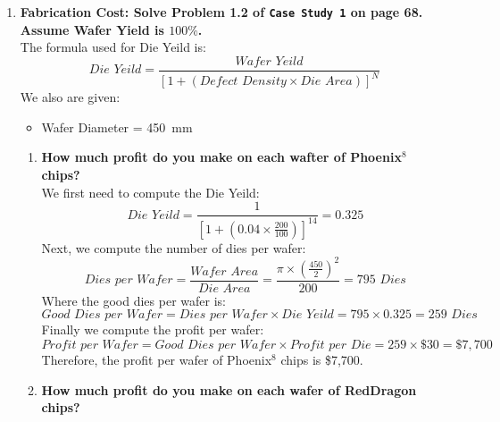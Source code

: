 \begin{enumerate}
    \item \textbf{Fabrication Cost: Solve Problem 1.2 of \texttt{Case Study 1} on page 68. Assume Wafer Yield is $100\%$.}  \\
          The formula used for Die Yeild is:
          \begin{equation*}
              \textit{Die Yeild} = \frac{\textit{Wafer Yeild}}{[1 + (\textit{Defect Density} \times \textit{Die Area})]^{N}}
          \end{equation*}
          We also are given:
          \begin{itemize}
              \item Wafer Diameter = \SI{450}{mm}
          \end{itemize}
          \begin{enumerate}
              \item \textbf{How much profit do you make on each wafter of Phoenix$^{8}$ chips?} \\
                    We first need to compute the Die Yeild:
                    \begin{equation*}
                        \textit{Die Yeild} = \frac{1}{[1 + (0.04 \times \frac{200}{100})]^{14}} = 0.325
                    \end{equation*}
                    Next, we compute the number of dies per wafer:
                    \begin{equation*}
                        \textit{Dies per Wafer} = \frac{\textit{Wafer Area}}{\textit{Die Area}} = \frac{\pi \times (\frac{450}{2})^{2}}{200} = 795 \textit{ Dies}
                    \end{equation*}
                    Where the good dies per wafer is:
                    \begin{equation*}
                        \textit{Good Dies per Wafer} = \textit{Dies per Wafer} \times \textit{Die Yeild} = 795 \times 0.325 = 259 \textit{ Dies}
                    \end{equation*}
                    Finally we compute the profit per wafer:
                    \begin{equation*}
                        \textit{Profit per Wafer} = \textit{Good Dies per Wafer} \times \textit{Profit per Die} = 259 \times \$30 = \$7,700
                    \end{equation*}
                    Therefore, the profit per wafer of Phoenix$^{8}$ chips is \$7,700.
              \item \textbf{How much profit do you make on each wafer of RedDragon chips?} \\

\end{enumerate}
\end{enumerate}
